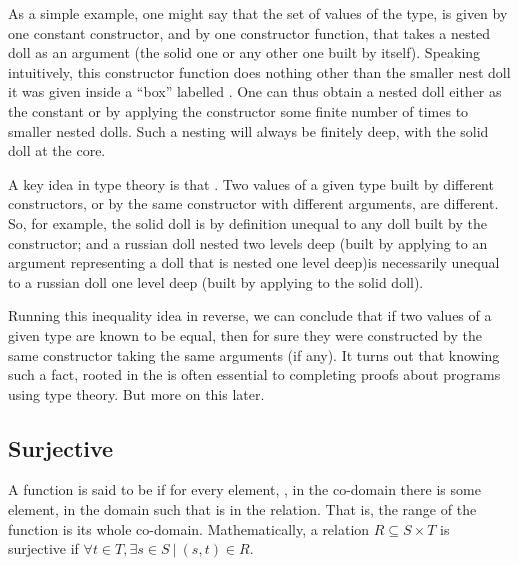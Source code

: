 \documentclass[letterpaper,10pt,english]{sphinxmanual}
\begin{document}
As a simple example, one might say that the set of values of the type,
 is given by one constant constructor,  and
by one constructor function,  that takes a nested doll as an
argument (the solid one or any other one built by  itself).
Speaking intuitively, this constructor function does nothing other
than  the smaller nest doll it was given inside a “box”
labelled .  One can thus obtain a nested doll either as the
constant  or by applying the  constructor some
finite number of times to smaller nested dolls. Such a nesting will
always be finitely deep, with the solid doll at the core.

A key idea in type theory is that . Two
values of a given type built by different constructors, or by the same
constructor with different arguments, are  different. So, for
example, the solid doll is by definition unequal to any doll built by
the  constructor; and a russian doll nested two levels deep
(built by applying  to an argument representing a doll that
is nested one level deep)is necessarily unequal to a russian doll one
level deep (built by applying  to the solid doll).

Running this inequality idea in reverse, we can conclude that if two
values of a given type are known to be equal, then for sure they were
constructed by the same constructor taking the same arguments (if
any).  It turns out that knowing such a fact, rooted in the
 is often essential to completing proofs
about programs using type theory. But more on this later.


\subsection{Surjective}
\label{\detokenize{07-set-theory:surjective}}
A function is said to be  if for every element, , in
the co-domain there is some element,  in the domain such that
 is in the relation. That is, the range  of the function
is its whole co-domain. Mathematically, a relation \(R \subseteq
S \times T\) is surjective if \(\forall t \in T, \exists s \in
S~|~(s,t) \in R\).
\end{document}
